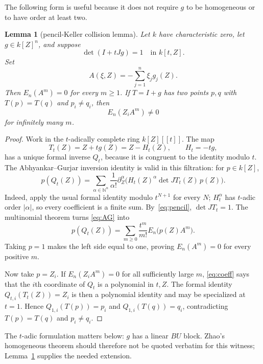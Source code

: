 \documentclass[11pt]{article}
\newtheorem{lemma}[theorem]{Lemma}
\newcommand{\N}{\mathbb N}
\begin{document}
The following form is useful because it does not require $g$ to be
homogeneous or to have order at least two.

\begin{lemma}[pencil-Keller collision lemma]\label{lem:pencil}
Let $k$ have characteristic zero, let $g\in k[Z]^n$, and suppose
\begin{equation}
 \det(I+tJg)=1\quad\text{in }k[t,Z]. \label{eq:pencil}
\end{equation}
Set
\[
 A(\xi,Z)=-\sum_{j=1}^n\xi_jg_j(Z).
\]
Then $E_n(A^m)=0$ for every $m\geq1$. If $T=I+g$ has two points $p,q$
with $T(p)=T(q)$ and $p_i\ne q_i$, then
\[
 E_n(Z_iA^m)\ne0
\]
for infinitely many $m$.
\end{lemma}

\begin{proof}
Work in the $t$-adically complete ring $k[Z][[t]]$. The map
\[
 T_t(Z)=Z+tg(Z)=Z-H_t(Z),\qquad H_t=-tg,
\]
has a unique formal inverse $Q_t$, because it is congruent to the identity
modulo $t$. The Abhyankar--Gurjar inversion identity is valid in this
filtration: for $p\in k[Z]$,
\begin{equation}
 p(Q_t(Z))=
 \sum_{\alpha\in\N^n}\frac1{\alpha!}\partial_Z^\alpha
 \bigl(H_t(Z)^\alpha\det JT_t(Z)\,p(Z)\bigr). \label{eq:AG}
\end{equation}
Indeed, apply the usual formal identity modulo $t^{N+1}$ for every $N$;
$H_t^\alpha$ has $t$-adic order $|\alpha|$, so every coefficient is a finite
sum. By~\eqref{eq:pencil}, $\det JT_t=1$. The multinomial theorem turns
\eqref{eq:AG} into
\begin{equation}
 p(Q_t(Z))=\sum_{m\geq0}\frac{t^m}{m!}E_n\bigl(p(Z)A^m\bigr). \label{eq:coeff}
\end{equation}
Taking $p=1$ makes the left side equal to one, proving
$E_n(A^m)=0$ for every positive $m$.

Now take $p=Z_i$. If $E_n(Z_iA^m)=0$ for all sufficiently large $m$,
\eqref{eq:coeff} says that the $i$th coordinate of $Q_t$ is a polynomial in
$t,Z$. The formal identity $Q_{t,i}(T_t(Z))=Z_i$ is then a polynomial
identity and may be specialized at $t=1$. Hence
$Q_{1,i}(T(p))=p_i$ and $Q_{1,i}(T(q))=q_i$, contradicting
$T(p)=T(q)$ and $p_i\ne q_i$.
\end{proof}

The $t$-adic formulation matters below: $g$ has a linear $BU$ block. Zhao's
homogeneous theorem should therefore not be quoted verbatim for this witness;
Lemma~\ref{lem:pencil} supplies the needed extension.
\end{document}
